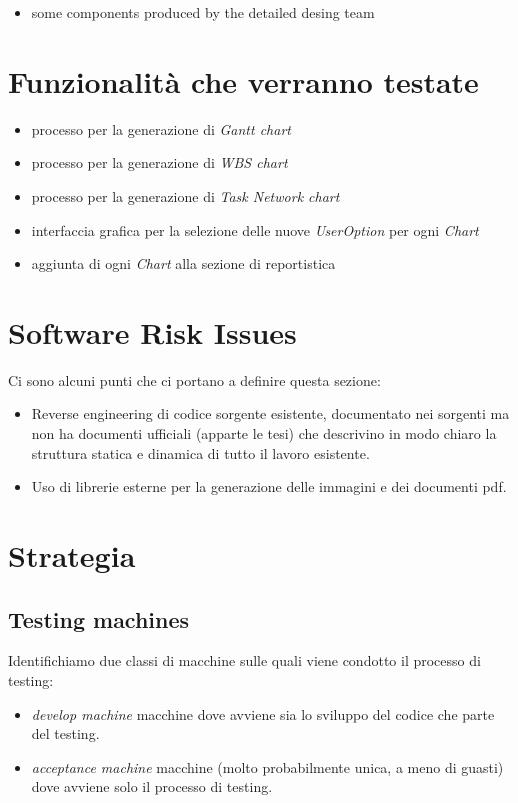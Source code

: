 \begin{itemize}
  \item some components produced by the detailed desing team
\end{itemize}

\section{Funzionalit\`a che verranno testate}
\begin{itemize}
  \item processo per la generazione di \emph{Gantt chart}
  \item processo per la generazione di \emph{WBS chart}
  \item processo per la generazione di \emph{Task Network chart}
  \item interfaccia grafica per la selezione delle nuove \emph{UserOption} per
  ogni \emph{Chart}
  \item aggiunta di ogni \emph{Chart} alla sezione di reportistica
\end{itemize}

\section{Software Risk Issues}
Ci sono alcuni punti che ci portano a definire questa sezione:
\begin{itemize}
  \item Reverse engineering di codice sorgente esistente, documentato nei sorgenti
ma non ha documenti ufficiali (apparte le tesi) che descrivino in modo chiaro
la struttura statica e dinamica di tutto il lavoro esistente.
  \item Uso di librerie esterne per la generazione delle immagini e dei
  documenti pdf.
\end{itemize}

\section{Strategia}

\subsection{Testing machines}
Identifichiamo due classi di macchine sulle quali viene condotto il processo di
testing:
\begin{itemize}
  \item \emph{develop machine} macchine dove avviene sia lo sviluppo del codice
  che parte del testing.
  \item \emph{acceptance machine} macchine (molto probabilmente unica, a meno
  di guasti) dove avviene solo il processo di testing.
\end{itemize}

